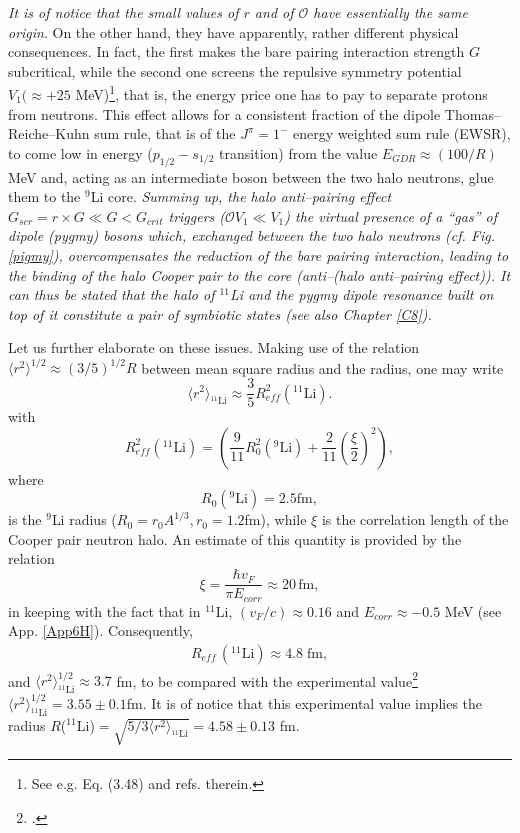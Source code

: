 \textit{It is of notice that the small values of $r$ and of $\mathcal{O}$ have essentially the same origin}. On the other hand, they have apparently, rather different physical consequences. In fact, the first makes the bare pairing interaction strength $G$ subcritical, while the second one screens the repulsive symmetry potential $V_1(\approx +25 $ MeV)\footnote{See e.g. \cite{Bortignon:98} Eq. (3.48) and refs. therein.}, that is, the energy price one has to pay to separate protons from neutrons. This effect allows for a consistent fraction of the dipole Thomas--Reiche--Kuhn sum rule, that is of the $J^{\pi}=1^-$ energy weighted sum rule (EWSR), to come low in energy ($p_{1/2}-s_{1/2}$ transition) from the value $E_{GDR}\approx(100/R)$ MeV and, acting as an intermediate boson between the two halo neutrons, glue them to the $^{9}$Li core. \textit{Summing up, the halo anti--pairing effect $G_{scr}=r\times G\ll G<G_{crit}$ triggers ($\mathcal{O}V_1\ll V_1$) the virtual presence of a ``gas'' of dipole (pygmy) bosons which, exchanged between the two halo neutrons (cf. Fig. \ref{pigmy}), overcompensates the reduction of the bare pairing interaction, leading to the binding of the halo Cooper pair to the core (anti--(halo anti--pairing effect)). It can thus be stated that the halo of $^{11}$Li and the pygmy dipole resonance built on top of it constitute a pair of symbiotic states (see also Chapter \ref{C8}).}

Let us further elaborate on these issues. Making use of the relation $\langle r^2\rangle^{1/2}\approx (3/5)^{1/2}R$ between mean square radius and the radius, one may write
\begin{equation}\label{eq2.6.9}
\langle r^2\rangle_{^{11}\text{Li}}\approx \frac{3}{5}R_{eff}^2(^{11}\text{Li}).
\end{equation}
 with
\begin{equation}\label{eq2.6.10}
R_{eff}^2(^{11}\text{Li})=\left(\frac{9}{11}R_0^2(^9\text{Li})+\frac{2}{11}\left(\frac{\xi}{2}\right)^2\right),
\end{equation}
where
\begin{equation}
R_0(^9\text{Li})=2.5 \text{fm},
\end{equation}
is the $^9$Li radius ($R_0=r_0A^{1/3}, r_0=1.2$fm), while $\xi$ is the correlation length of the Cooper pair neutron halo. An estimate of this quantity is provided by the relation
 \begin{equation}
\xi=\frac{\hbar v_F}{\pi E_{corr}}\approx 20 \, \text{fm},
 \end{equation}
in keeping with the fact that in $^{11}$Li, $(v_F/c)\approx 0.16$ and $E_{corr}\approx-0.5$ MeV (see App. \ref{App6H}). Consequently, 
\begin{align}\label{eq2.F.5}
R_{eff}\,(^{11}\text{Li})\approx 4.8 \;\text{fm},
\end{align} 
and  $\langle r^2\rangle_{^{11}\text{Li}}^{1/2}\approx 3.7$ fm, to be compared with the experimental value\footnote{\cite{Kobayashi:89}.} $\langle r^2\rangle_{^{11}\text{Li}}^{1/2}= 3.55\pm0.1$fm. It is of notice that this experimental value implies  the radius $R$($^{11}$Li)$=\sqrt{5/3\langle r^2\rangle_{^{11}\text{Li}}}=4.58\pm 0.13$ fm.


